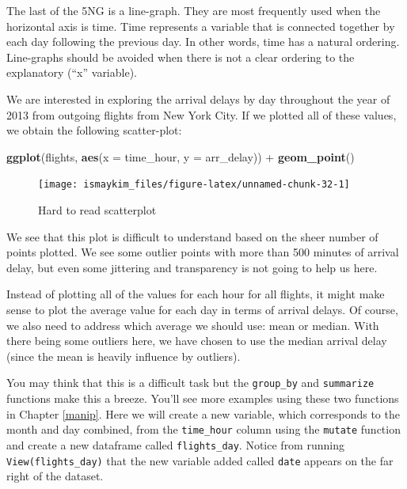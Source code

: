 \documentclass[]{tufte-book}
\newenvironment{Shaded}{\begin{snugshade}}{\end{snugshade}}
\newcommand{\KeywordTok}[1]{\textcolor[rgb]{0.13,0.29,0.53}{\textbf{{#1}}}}
\newcommand{\DataTypeTok}[1]{\textcolor[rgb]{0.13,0.29,0.53}{{#1}}}
\newcommand{\StringTok}[1]{\textcolor[rgb]{0.31,0.60,0.02}{{#1}}}
\newcommand{\NormalTok}[1]{{#1}}
\begin{document}
The last of the 5NG is a line-graph. They are most frequently used when
the horizontal axis is time. Time represents a variable that is
connected together by each day following the previous day. In other
words, time has a natural ordering. Line-graphs should be avoided when
there is not a clear ordering to the explanatory (``x'' variable).

We are interested in exploring the arrival delays by day throughout the
year of 2013 from outgoing flights from New York City. If we plotted all
of these values, we obtain the following scatter-plot:

\begin{Shaded}
\begin{Highlighting}[]
\KeywordTok{ggplot}\NormalTok{(flights, }\KeywordTok{aes}\NormalTok{(}\DataTypeTok{x =} \NormalTok{time_hour, }\DataTypeTok{y =} \NormalTok{arr_delay)) +}\StringTok{ }
\StringTok{  }\KeywordTok{geom_point}\NormalTok{()}
\end{Highlighting}
\end{Shaded}

\begin{figure}

{\centering \texttt{[image: ismaykim\_files/figure-latex/unnamed-chunk-32-1]} 

}

\caption[Hard to read scatterplot]{Hard to read scatterplot}\label{fig:unnamed-chunk-32}
\end{figure}

We see that this plot is difficult to understand based on the sheer
number of points plotted. We see some outlier points with more than 500
minutes of arrival delay, but even some jittering and transparency is
not going to help us here.

Instead of plotting all of the values for each hour for all flights, it
might make sense to plot the average value for each day in terms of
arrival delays. Of course, we also need to address which average we
should use: mean or median. With there being some outliers here, we have
chosen to use the median arrival delay (since the mean is heavily
influence by outliers).

You may think that this is a difficult task but the \texttt{group\_by}
and \texttt{summarize} functions make this a breeze. You'll see more
examples using these two functions in Chapter \ref{manip}. Here we will
create a new variable, which corresponds to the month and day combined,
from the \texttt{time\_hour} column using the \texttt{mutate} function
and create a new dataframe called \texttt{flights\_day}. Notice from
running \texttt{View(flights\_day)} that the new variable added called
\texttt{date} appears on the far right of the dataset.
\end{document}
